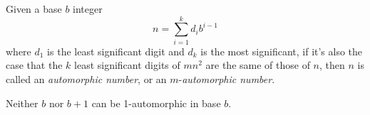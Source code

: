 \documentclass[12pt]{article}
\begin{document}
Given a base $b$ integer $$n = \sum_{i = 1}^k d_ib^{i - 1}$$ where $d_1$ is the least significant digit and $d_k$ is the most significant, if it's also the case that the $k$ least significant digits of $mn^2$ are the same of those of $n$, then $n$ is called an {\em automorphic number}, or an $m$-{\em automorphic number}.

Neither $b$ nor $b + 1$ can be 1-automorphic in base $b$.
\end{document}
